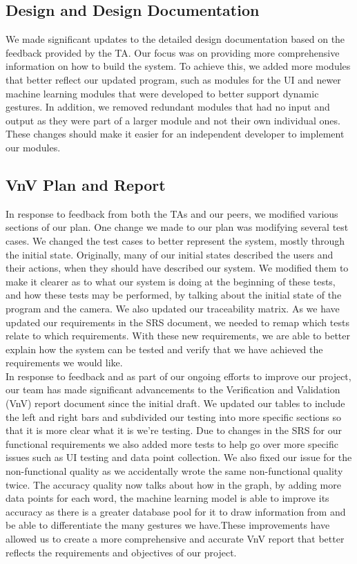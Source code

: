 \documentclass[12pt, titlepage]{article}
\begin{document}
\subsection{Design and Design Documentation}
We made significant updates to the detailed design documentation based on the feedback provided by the TA. Our focus was on providing more comprehensive information on how to build the system. To achieve this, we added more modules that better reflect our updated program, such as modules for the UI and newer machine learning modules that were developed to better support dynamic gestures. In addition, we removed redundant modules that had no input and output as they were part of a larger module and not their own individual ones. These changes should make it easier for an independent developer to implement our modules.\\

\subsection{VnV Plan and Report}
In response to feedback from both the TAs and our peers, we modified various sections of our plan. One change we made to our plan was modifying several test cases. We changed the test cases to better represent the system, mostly through the initial state. Originally, many of our initial states described the users and their actions, when they should have described our system. We modified them to make it clearer as to what our system is doing at the beginning of these tests, and how these tests may be performed, by talking about the initial state of the program and the camera. We also updated our traceability matrix. As we have updated our requirements in the SRS document, we needed to remap which tests relate to which requirements. With these new requirements, we are able to better explain how the system can be tested and verify that we have achieved the requirements we would like.\\

\noindent In response to feedback and as part of our ongoing efforts to improve our project, our team has made significant advancements to the Verification and Validation (VnV) report document since the initial draft. We updated our tables to include the left and right bars and subdivided our testing into more specific sections so that it is more clear what it is we’re testing. Due to changes in the SRS for our functional requirements we also added more tests to help go over more specific issues such as UI testing and data point collection. We also fixed our issue for the non-functional quality as we accidentally wrote the same non-functional quality twice. The accuracy quality now talks about how in the graph, by adding more data points for each word, the machine learning model is able to improve its accuracy as there is a greater database pool for it to draw information from and be able to differentiate the many gestures we have.These improvements have allowed us to create a more comprehensive and accurate VnV report that better reflects the requirements and objectives of our project.\\
\end{document}
